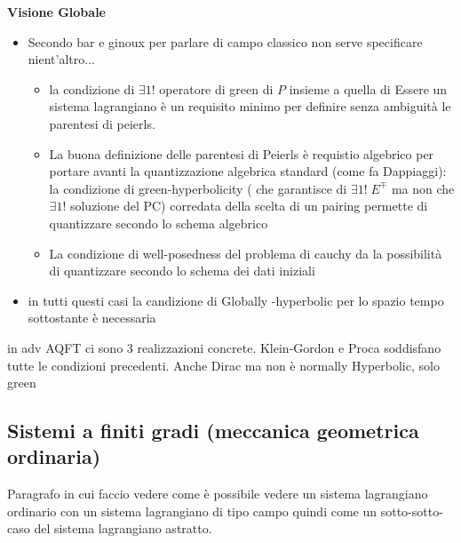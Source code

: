 \documentclass[Main]{subfiles}
\begin{document}
		\begin{observation}
			\begin{center}
				\textbf{Visione Globale}
			\end{center}
			\begin{itemize}
			\item Secondo bar e ginoux per parlare di campo classico non serve specificare nient'altro...
				\begin{itemize}
					\item la condizione di $\exists  1!$ operatore di green di $P$  insieme a quella di Essere un sistema lagrangiano è un requisito minimo  per definire senza ambiguità le parentesi di peierls.
					\item La buona definizione delle parentesi di Peierls è requistio algebrico per portare avanti la quantizzazione algebrica standard (come fa Dappiaggi): \\
					la condizione di green-hyperbolicity ( che garantisce di $\exists 1!\; E^\mp$ ma non che  $\exists 1!$ soluzione del PC) corredata della scelta di un pairing permette di quantizzare secondo lo schema algebrico
					\item La condizione di well-posedness del problema di cauchy da la possibilità di quantizzare secondo lo schema dei dati iniziali
				\end{itemize}
				\item in tutti questi casi la candizione di Globally -hyperbolic per lo spazio tempo sottostante è necessaria
			\end{itemize}
		\end{observation}
		
		\begin{example}
			in adv AQFT ci sono 3 realizzazioni concrete. Klein-Gordon e Proca soddisfano tutte le condizioni precedenti. Anche Dirac ma non è normally Hyperbolic, solo green
		\end{example}

	\subsection{Sistemi a finiti gradi (meccanica geometrica ordinaria)}
		Paragrafo in cui faccio vedere come è possibile vedere un sistema lagrangiano ordinario con un sistema lagrangiano di tipo campo quindi come un sotto-sotto-caso del sistema lagrangiano astratto.
\end{document}
